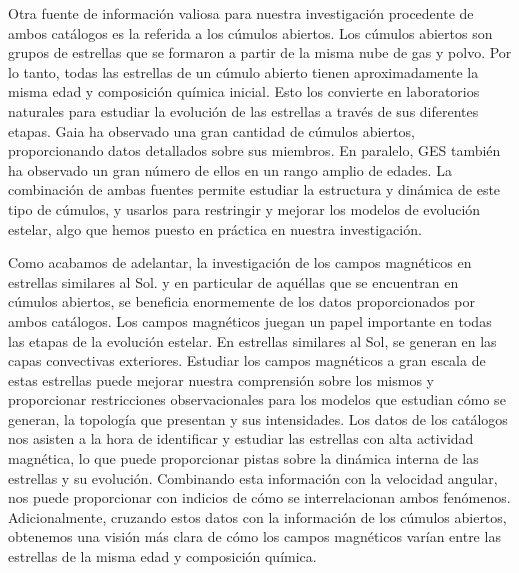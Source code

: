 Otra fuente de información valiosa para nuestra investigación procedente de ambos catálogos es la referida a los cúmulos abiertos. Los cúmulos abiertos son grupos de estrellas que se formaron a partir de la misma nube de gas y polvo. Por lo tanto, todas las estrellas de un cúmulo abierto tienen aproximadamente la misma edad y composición química inicial. Esto los convierte en laboratorios naturales para estudiar la evolución de las estrellas a través de sus diferentes etapas. Gaia ha observado una gran cantidad de cúmulos abiertos, proporcionando datos detallados sobre sus miembros. En paralelo, GES también ha observado un gran número de ellos en un rango amplio de edades. La combinación de ambas fuentes permite estudiar la estructura y dinámica de este tipo de cúmulos, y usarlos para restringir y mejorar los modelos de evolución estelar, algo que hemos puesto en práctica en nuestra investigación.\par

Como acabamos de adelantar, la investigación de los campos magnéticos en estrellas similares al Sol. y en particular de aquéllas que se encuentran en cúmulos abiertos, se beneficia enormemente de los datos proporcionados por ambos catálogos. Los campos magnéticos juegan un papel importante en todas las etapas de la evolución estelar. En estrellas similares al Sol, se generan en las capas convectivas exteriores. Estudiar los campos magnéticos a gran escala de estas estrellas puede mejorar nuestra comprensión sobre los mismos y proporcionar restricciones observacionales para los modelos que estudian cómo se generan, la topología que presentan y sus intensidades. Los datos de los catálogos nos asisten a la hora de identificar y estudiar las estrellas con alta actividad magnética, lo que puede proporcionar pistas sobre la dinámica interna de las estrellas y su evolución. Combinando esta información con la velocidad angular, nos puede proporcionar con indicios de cómo se interrelacionan ambos fenómenos. Adicionalmente, cruzando estos datos con la información de los cúmulos abiertos, obtenemos una visión más clara de cómo los campos magnéticos varían entre las estrellas de la misma edad y composición química.\par

